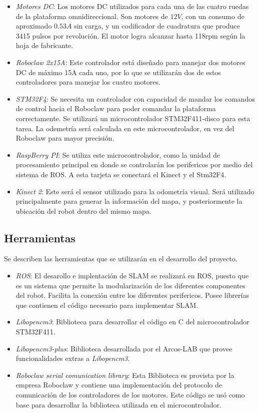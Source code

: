\begin{itemize}
\item \textit{Motores DC}: Los motores DC utilizados para cada una de las cuatro ruedas de la plataforma omnidireccional. Son motores de $12V$, con un consumo de aproximado $0.53A$ sin carga, y un codificador de cuadratura que produce 3415 pulsos por revolución. El motor logra alcanzar hasta 118rpm según la hoja de fabricante.
\item \textit{Roboclaw 2x15A}: Este controlador está diseñado para manejar dos motores DC de máximo 15A cada uno, por lo que se utilizarán dos de estos controladores para manejar los cuatro motores.
\item \textit{STM32F4}: Se necesita un controlador con capacidad de mandar los comandos de control hacia el Roboclaw para poder comandar la plataforma correctamente. Se utilizará un microcontrolador STM32F411-disco para esta tarea. La odemetría será calculada en este microcontrolador, en vez del Roboclaw para mayor precisión.
\item \textit{RaspBerry PI}: Se utiliza este microcontrolador, como la unidad de procesamiento principal en donde se controlarán los perifericos por medio del sistema de ROS. A esta tarjeta se conectará el Kinect y el Stm32F4.
\item \textit{Kinect 2}: Este será el sensor utilizado para la odometría visual. Será utilizado principalmente para generar la información del mapa, y posteriormente la ubicación del robot dentro del mismo mapa.
\end{itemize}

\subsection{Herramientas}
Se describen las herramientas que se utilizarán en el desarrollo del proyecto.

\begin{itemize}
\item \textit{ROS}: El desarollo e implentación de SLAM se realizará en ROS, puesto que es un sistema que permite la modularización de los diferentes componentes del robot. Facilita la conexión entre los diferentes perifericos. Posee librerías que contienen el código necesario para implementar SLAM.
\item \textit{Libopencm3}: Biblioteca para desarrollar el código en C del microcontrolador STM32F411.
\item \textit{Libopencm3-plus}: Biblioteca desarrollada por el Arcos-LAB que provee funcionalidades extras a \textit{Libopencm3}.
\item \textit{Roboclaw serial comunication library}: Esta Biblioteca es provista por la empresa Roboclaw y contiene una implementación del protocolo de comunicación de los controladores de los motores. Este código se usó como base para desarrollar la biblioteca utilizada en el microcontrolador.
\end{itemize}

